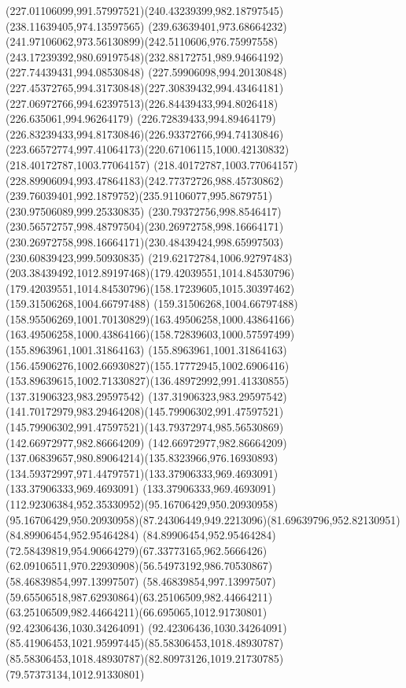 {{		\curveto(227.01106099,991.57997521)(240.43239399,982.18797545)(238.11639405,974.13597565)
		\curveto(239.63639401,973.68664232)(241.97106062,973.56130899)(242.5110606,976.75997558)
		\curveto(243.17239392,980.69197548)(232.88172751,989.94664192)(227.74439431,994.08530848)
		\curveto(227.59906098,994.20130848)(227.45372765,994.31730848)(227.30839432,994.43464181)
		\curveto(227.06972766,994.62397513)(226.84439433,994.8026418)(226.635061,994.96264179)
		\curveto(226.72839433,994.89464179)(226.83239433,994.81730846)(226.93372766,994.74130846)
		\curveto(223.66572774,997.41064173)(220.67106115,1000.42130832)(218.40172787,1003.77064157)
		\curveto(218.40172787,1003.77064157)(228.89906094,993.47864183)(242.77372726,988.45730862)
		\curveto(239.76039401,992.1879752)(235.91106077,995.8679751)(230.97506089,999.25330835)
		\curveto(230.79372756,998.8546417)(230.56572757,998.48797504)(230.26972758,998.16664171)
		\curveto(230.26972758,998.16664171)(230.48439424,998.65997503)(230.60839423,999.50930835)
		\curveto(219.62172784,1006.92797483)(203.38439492,1012.89197468)(179.42039551,1014.84530796)
		\curveto(179.42039551,1014.84530796)(158.17239605,1015.30397462)(159.31506268,1004.66797488)
		\curveto(159.31506268,1004.66797488)(158.95506269,1001.70130829)(163.49506258,1000.43864166)
		\curveto(163.49506258,1000.43864166)(158.72839603,1000.57597499)(155.8963961,1001.31864163)
		\curveto(155.8963961,1001.31864163)(156.45906276,1002.66930827)(155.17772945,1002.6906416)
		\curveto(153.89639615,1002.71330827)(136.48972992,991.41330855)(137.31906323,983.29597542)
		\curveto(137.31906323,983.29597542)(141.70172979,983.29464208)(145.79906302,991.47597521)
		\curveto(145.79906302,991.47597521)(143.79372974,985.56530869)(142.66972977,982.86664209)
		\curveto(142.66972977,982.86664209)(137.06839657,980.89064214)(135.8323966,976.16930893)
		\curveto(134.59372997,971.44797571)(133.37906333,969.4693091)(133.37906333,969.4693091)
		\curveto(133.37906333,969.4693091)(112.92306384,952.35330952)(95.16706429,950.20930958)
		\curveto(95.16706429,950.20930958)(87.24306449,949.2213096)(81.69639796,952.82130951)
		\lineto(84.89906454,952.95464284)
		\curveto(84.89906454,952.95464284)(72.58439819,954.90664279)(67.33773165,962.5666426)
		\curveto(62.09106511,970.22930908)(56.54973192,986.70530867)(58.46839854,997.13997507)
		\curveto(58.46839854,997.13997507)(59.65506518,987.62930864)(63.25106509,982.44664211)
		\curveto(63.25106509,982.44664211)(66.695065,1012.91730801)(92.42306436,1030.34264091)
		\curveto(92.42306436,1030.34264091)(85.41906453,1021.95997445)(85.58306453,1018.48930787)
		\curveto(85.58306453,1018.48930787)(82.80973126,1019.21730785)(79.57373134,1012.91330801)
}}
